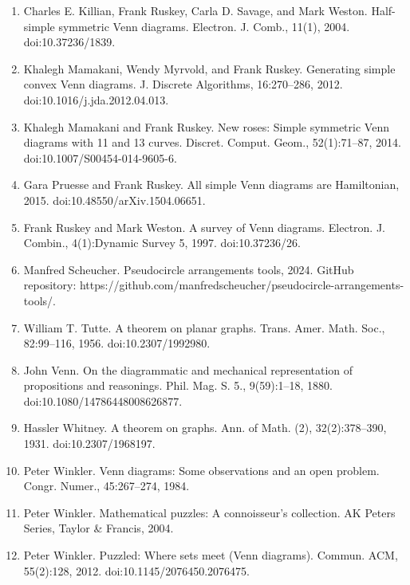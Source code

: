 \documentclass[10pt,a4paper]{article}
\begin{document}
\begin{enumerate}
\item[]  [11]  Charles E. Killian, Frank Ruskey, Carla D. Savage, and Mark Weston.  Half-simple symmetric Venn diagrams.  Electron. J. Comb., 11(1), 2004.  doi:10.37236/1839.  
\item[]  [12]  Khalegh Mamakani, Wendy Myrvold, and Frank Ruskey.  Generating simple convex Venn diagrams.  J. Discrete Algorithms, 16:270–286, 2012.  doi:10.1016/j.jda.2012.04.013.  
\item[]  [13]  Khalegh Mamakani and Frank Ruskey.  New roses: Simple symmetric Venn diagrams with 11 and 13 curves.  Discret. Comput. Geom., 52(1):71–87, 2014.  doi:10.1007/S00454-014-9605-6.  
\item[]  [14]  Gara Pruesse and Frank Ruskey.  All simple Venn diagrams are Hamiltonian, 2015.  doi:10.48550/arXiv.1504.06651.  
\item[]  [15]  Frank Ruskey and Mark Weston.  A survey of Venn diagrams.  Electron. J. Combin., 4(1):Dynamic Survey 5, 1997.  doi:10.37236/26.  
\item[]  [16]  Manfred Scheucher.  Pseudocircle arrangements tools, 2024.  GitHub repository: https://github.com/manfredscheucher/pseudocircle-arrangements-tools/.  
\item[]  [17]  William T. Tutte.  A theorem on planar graphs.  Trans. Amer. Math. Soc., 82:99–116, 1956.  doi:10.2307/1992980.  
\item[]  [18]  John Venn.  On the diagrammatic and mechanical representation of propositions and reasonings.  Phil. Mag. S. 5., 9(59):1–18, 1880.  doi:10.1080/14786448008626877.  
\item[]  [19]  Hassler Whitney.  A theorem on graphs.  Ann. of Math. (2), 32(2):378–390, 1931.  doi:10.2307/1968197.  
\item[]  [20]  Peter Winkler.  Venn diagrams: Some observations and an open problem.  Congr. Numer., 45:267–274, 1984.  
\item[]  [21]  Peter Winkler.  Mathematical puzzles: A connoisseur’s collection.  AK Peters Series, Taylor \& Francis, 2004.  
\item[]  [22]  Peter Winkler.  Puzzled: Where sets meet (Venn diagrams).  Commun. ACM, 55(2):128, 2012.  doi:10.1145/2076450.2076475.  
\end{enumerate}
\end{document}
